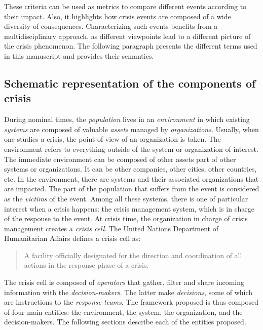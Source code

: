These criteria can be used as metrics to compare different events according to their impact.
Also, it highlights how crisis events are composed of a wide diversity of consequences.
Characterizing such events benefits from a multidisciplinary approach, as different viewpoints lead to a different picture of the crisis phenomenon.
The following paragraph presents the different terms used in this manuscript and provides their semantics.

\subsection{Schematic representation of the components of crisis}
During nominal times, the \emph{population} lives in an \emph{environment} in which existing \emph{systems} are composed of valuable \emph{assets} managed by \emph{organizations}.
Usually, when one studies a crisis, the point of view of an organization is taken.
The environment refers to everything outside of the system or organization of interest.
The immediate environment can be composed of other assets part of other systems or organizations.
It can be other companies, other cities, other countries, etc.
In the environment, there are systems and their associated organizations that are impacted.
The part of the population that suffers from the event is considered as the \emph{victims} of the event.
Among all these systems, there is one of particular interest when a crisis happens: the crisis management system, which is in charge of the response to the event.
At crisis time, the organization in charge of crisis management creates a \emph{crisis cell}.
The United Nations Department of Humanitarian Affairs \parencite{undepartmentofhumanitarianaffairsInternationallyAgreedGlossary1992} defines a crisis cell as:
\blockquote{A facility officially designated for the direction and coordination of all actions in the response phase of a crisis.}
The crisis cell is composed of \emph{operators} that gather, filter and share incoming information with the \emph{decision-makers}.
The latter make \emph{decisions}, some of which are instructions to the \emph{response teams}.
The framework proposed is thus composed of four main entities: the environment, the system, the organization, and the decision-makers.
The following sections describe each of the entities proposed.

